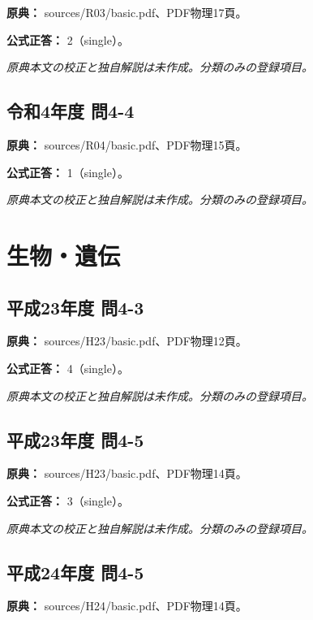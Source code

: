 \noindent\textbf{原典：} sources/R03/basic.pdf、PDF物理17頁。

\textbf{公式正答：} 2（single）。

\par\textit{原典本文の校正と独自解説は未作成。分類のみの登録項目。}

\subsection{令和4年度 問4-4}
\label{q:r04-reg-basic-4-4}

\noindent\textbf{原典：} sources/R04/basic.pdf、PDF物理15頁。

\textbf{公式正答：} 1（single）。

\par\textit{原典本文の校正と独自解説は未作成。分類のみの登録項目。}

\section{生物・遺伝}

\subsection{平成23年度 問4-3}
\label{q:h23-reg-basic-4-3}

\noindent\textbf{原典：} sources/H23/basic.pdf、PDF物理12頁。

\textbf{公式正答：} 4（single）。

\par\textit{原典本文の校正と独自解説は未作成。分類のみの登録項目。}

\subsection{平成23年度 問4-5}
\label{q:h23-reg-basic-4-5}

\noindent\textbf{原典：} sources/H23/basic.pdf、PDF物理14頁。

\textbf{公式正答：} 3（single）。

\par\textit{原典本文の校正と独自解説は未作成。分類のみの登録項目。}

\subsection{平成24年度 問4-5}
\label{q:h24-reg-basic-4-5}

\noindent\textbf{原典：} sources/H24/basic.pdf、PDF物理14頁。

